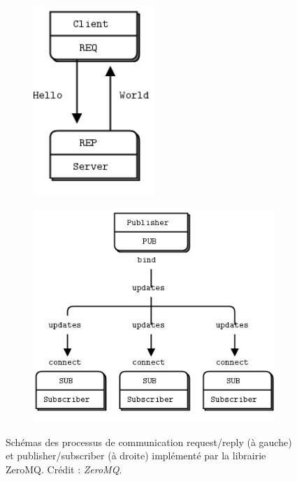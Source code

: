 \begin{figure}[ht!]
    \centering
    \begin{subfigure}{0.45\textwidth}
        \centering
        \includegraphics[width=0.5\textwidth]{Figure_Chap2/ZMQ_ReqRep_Figure.png}
    \end{subfigure}%
    \begin{subfigure}{0.45\textwidth}
        \centering
        \includegraphics[width=\textwidth]{Figure_Chap2/ZMQ_PubSub_Figure.png}
    \end{subfigure}
    \caption[Schémas des processus de communication request/reply et publisher/subscriber de la librairie ZeroMQ.]{Schémas des processus de communication request/reply (à gauche) et publisher/subscriber (à droite) implémenté par la librairie ZeroMQ. Crédit : \textit{ZeroMQ}.}
    \label{fig:ZMQProtocols}
\end{figure}

